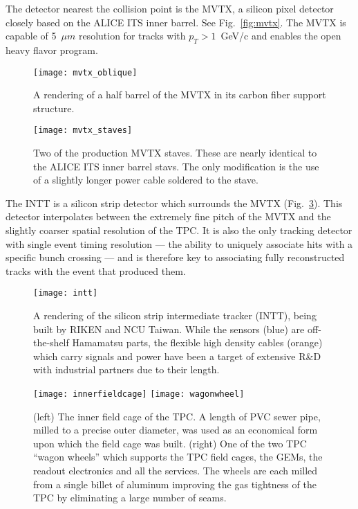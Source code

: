 The detector nearest the collision point is the MVTX, a silicon pixel
detector closely based on the ALICE ITS inner barrel.  See
Fig.~\ref{fig:mvtx}.  The MVTX is capable of 5~$\mu m$ resolution for
tracks with $p_T > 1$~GeV/c and enables the open heavy flavor program.

\begin{figure}[hbt!]
  \centering
  \texttt{[image: mvtx\_oblique]}
  \caption{A rendering of a half barrel of the MVTX in its carbon
    fiber support structure.}
  \label{fig:mvtx_oblique}
\end{figure}

\begin{figure}[hbt!]
  \centering
  \texttt{[image: mvtx\_staves]}
  \caption{Two of the production MVTX staves.  These are nearly
    identical to the ALICE ITS inner barrel stavs.  The only
    modification is the use of a slightly longer power cable soldered
    to the stave.}
  \label{fig:mvtx_oblique}
\end{figure}

The INTT is a silicon strip detector which surrounds the MVTX
(Fig.~\ref{fig:intt}).  This detector interpolates between the
extremely fine pitch of the MVTX and the slightly coarser spatial
resolution of the TPC.  It is also the only tracking detector with
single event timing resolution --- the ability to uniquely associate
hits with a specific bunch crossing --- and is therefore key to
associating fully reconstructed tracks with the event that produced
them.

\begin{figure}[hbt!]
  \centering
  \texttt{[image: intt]}
  \caption{A rendering of the silicon strip intermediate tracker
    (INTT), being built by RIKEN and NCU Taiwan.  While the sensors
    (blue) are off-the-shelf Hamamatsu parts, the flexible high
    density cables (orange) which carry signals and power have been a
    target of extensive R\&D with industrial partners due to their
    length.}
  \label{fig:intt}
\end{figure}


\begin{figure}[hbt!]
  \centering
  \texttt{[image: innerfieldcage]}
  \hfill
  \texttt{[image: wagonwheel]}
  \caption{(left) The inner field cage of the TPC. A length of PVC
    sewer pipe, milled to a precise outer diameter, was used as an
    economical form upon which the field cage was built.  (right) One
    of the two TPC ``wagon wheels'' which supports the TPC field
    cages, the GEMs, the readout electronics and all the services.
    The wheels are each milled from a single billet of aluminum
    improving the gas tightness of the TPC by eliminating a large
    number of seams.}
  \label{fig:wagonwheel}
\end{figure}

